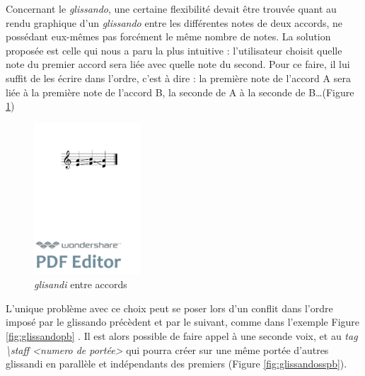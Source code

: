 \documentclass{article}
\newenvironment{gmncode}	{\vspace{-2mm}\small\verbatim}{\endverbatim\vspace{-2mm}}
\begin{document}
Concernant le \emph{glissando}, une certaine flexibilité devait être trouvée quant au rendu graphique d'un \emph{glissando} entre les différentes notes de deux accords, ne possédant eux-mêmes pas forcément le même nombre de notes. La solution proposée est celle qui nous a paru la plus intuitive : l'utilisateur choisit quelle note du premier accord sera liée avec quelle note du second. Pour ce faire, il lui suffit de les écrire dans l'ordre, c'est à dire : la première note de l'accord A sera liée à la première note de l'accord B, la seconde de A à la seconde de B\dots{}(Figure \ref{fig:glissandosimple})

\begin{figure}[h]
\begin{center}
\begin{gmncode}
[\glissando({e,a} {f,b} {a,d})]
\end{gmncode}
\bigskip

\includegraphics[width=4cm]{img/glissandosimple.pdf}
\caption{\emph{glisandi} entre accords}
\label{fig:glissandosimple}
\end{center}
\end{figure}

L'unique problème avec ce choix peut se poser lors d'un conflit dans l'ordre imposé par le glissando précèdent et par le suivant, comme dans l'exemple Figure \ref{fig:glissandopb} . Il est alors possible de faire appel à une seconde voix, et au \emph{tag \textbackslash{}staff \textless{}numero de portée\textgreater{}} qui pourra créer sur une même portée d'autres glissandi en parallèle et indépendants des premiers (Figure \ref{fig:glissandosspb}).
\end{document}
